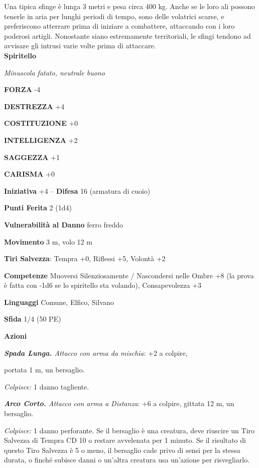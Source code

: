 \begin{multicols}{2}
Una tipica sfinge è lunga 3 metri e pesa circa 400 kg. Anche se le loro ali possono tenerle in aria per lunghi periodi di tempo, sono delle volatrici scarse, e preferiscono atterrare prima di iniziare a combattere, attaccando con i loro poderosi artigli. Nonostante siano estremamente territoriali, le sfingi tendono ad avvisare gli intrusi varie volte prima di attaccare.\\


\medskip{}\textbf{Spiritello}

\emph{Minuscola fatato, neutrale buono}

\textbf{FORZA} -4

\textbf{DESTREZZA} +4

\textbf{COSTITUZIONE} +0

\textbf{INTELLIGENZA} +2

\textbf{SAGGEZZA} +1

\textbf{CARISMA} +0

\textbf{Iniziativa} +4 -- \textbf{Difesa} 16 (armatura di cuoio)

\textbf{Punti Ferita} 2 (1d4)

\textbf{Vulnerabilità al Danno} ferro freddo

\textbf{Movimento} 3 m, volo 12 m

\textbf{Tiri Salvezza}: Tempra +0, Riflessi +5, Volontà +2

\textbf{Competenze} Muoversi Silenziosamente / Nascondersi nelle Ombre +8 (la prova è fatta con -1d6 se lo spiritello sta volando), Consapevolezza +3

\textbf{Linguaggi} Comune, Elfico, Silvano

\textbf{Sfida} 1/4 (50 PE)

\textbf{Azioni}

\emph{\textbf{Spada Lunga.} Attacco con arma da mischia}: +2 a colpire,

portata 1 m, un bersaglio.

\emph{Colpisce:} 1 danno tagliente.

\emph{\textbf{Arco Corto.} Attacco con arma a Distanza}: +6 a colpire, gittata 12 m, un bersaglio.

\emph{Colpisce:} 1 danno perforante. Se il bersaglio è una creatura, deve riuscire un Tiro Salvezza di Tempra CD 10 o restare avvelenata per 1 minuto. Se il risultato di questo Tiro Salvezza è 5 o meno, il bersaglio cade privo di sensi per la stessa durata, o finché subisce danni o un'altra creatura usa un'azione per risvegliarlo. 


\end{multicols}
